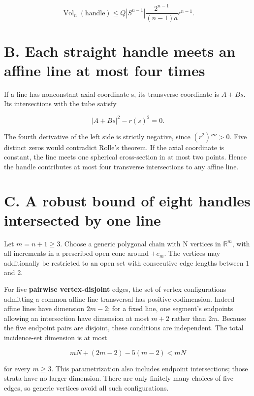 \documentclass[11pt,a4paper]{article}
\begin{document}
\[
 \operatorname{Vol}_n(\text{handle})
 \le Q|S^{n-1}|\frac{2^{n-1}}{(n-1)a}\epsilon^{n-1}.
 \tag{A5}
\]

\hypertarget{1022-b.-each-straight-handle-meets-an-affine-line-at-most-four-times}{%
\section{B. Each straight handle meets an affine line at most four
times}\label{1022-b.-each-straight-handle-meets-an-affine-line-at-most-four-times}}

If a line has nonconstant axial coordinate s, its transverse coordinate
is \(A+Bs\). Its intersections with the tube satisfy

\[
 |A+Bs|^2-r(s)^2=0.
\]

The fourth derivative of the left side is strictly negative, since
\((r^2)''''>0\). Five distinct zeros would contradict Rolle's theorem.
If the axial coordinate is constant, the line meets one spherical
cross-section in at most two points. Hence the handle contributes at
most four transverse intersections to any affine line.

\hypertarget{1022-c.-a-robust-bound-of-eight-handles-intersected-by-one-line}{%
\section{C. A robust bound of eight handles intersected by one
line}\label{1022-c.-a-robust-bound-of-eight-handles-intersected-by-one-line}}

Let \(m=n+1\ge 3\). Choose a generic polygonal chain with N vertices in
\(\mathbb R^m\), with all increments in a prescribed open cone around
\(+e_m\). The vertices may additionally be restricted to an open set
with consecutive edge lengths between 1 and 2.

For five \textbf{pairwise vertex-disjoint} edges, the set of vertex
configurations admitting a common affine-line transversal has positive
codimension. Indeed affine lines have dimension \(2m-2\); for a fixed
line, one segment's endpoints allowing an intersection have dimension at
most \(m+2\) rather than \(2m\). Because the five endpoint pairs are
disjoint, these conditions are independent. The total incidence-set
dimension is at most

\[
 mN+(2m-2)-5(m-2)<mN
\]

for every \(m\ge 3\). This parametrization also includes endpoint
intersections; those strata have no larger dimension. There are only
finitely many choices of five edges, so generic vertices avoid all such
configurations.
\end{document}
